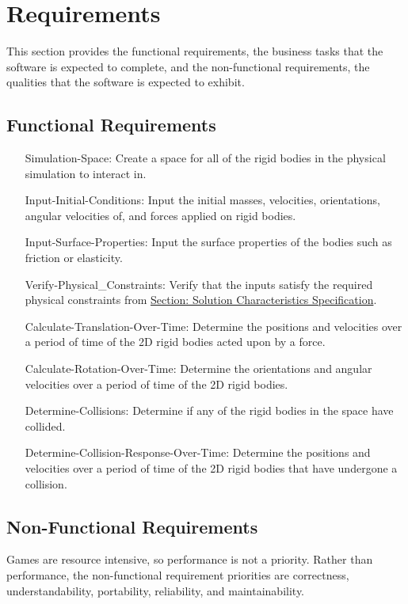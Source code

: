 \documentclass[12pt]{article}
\begin{document}
\section{Requirements}
\label{Sec:Requirements}
This section provides the functional requirements, the business tasks that the software is expected to complete, and the non-functional requirements, the qualities that the software is expected to exhibit.
\subsection{Functional Requirements}
\label{Sec:FRs}
\begin{itemize}
\item[Simulation-Space:\phantomsection\label{reqSS}]Create a space for all of the rigid bodies in the physical simulation to interact in.
\item[Input-Initial-Conditions:\phantomsection\label{reqIIC}]Input the initial masses, velocities, orientations, angular velocities of, and forces applied on rigid bodies.
\item[Input-Surface-Properties:\phantomsection\label{reqISP}]Input the surface properties of the bodies such as friction or elasticity.
\item[Verify-Physical\_Constraints:\phantomsection\label{reqVPC}]Verify that the inputs satisfy the required physical constraints from \hyperref[Sec:SolCharSpec]{Section: Solution Characteristics Specification}.
\item[Calculate-Translation-Over-Time:\phantomsection\label{reqCTOT}]Determine the positions and velocities over a period of time of the 2D rigid bodies acted upon by a force.
\item[Calculate-Rotation-Over-Time:\phantomsection\label{reqCROT}]Determine the orientations and angular velocities over a period of time of the 2D rigid bodies.
\item[Determine-Collisions:\phantomsection\label{reqDC}]Determine if any of the rigid bodies in the space have collided.
\item[Determine-Collision-Response-Over-Time:\phantomsection\label{reqDCROT}]Determine the positions and velocities over a period of time of the 2D rigid bodies that have undergone a collision.
\end{itemize}
\subsection{Non-Functional Requirements}
\label{Sec:NFRs}
Games are resource intensive, so performance is not a priority.  Rather than performance, the non-functional requirement priorities are correctness, understandability, portability, reliability, and maintainability.
\end{document}
